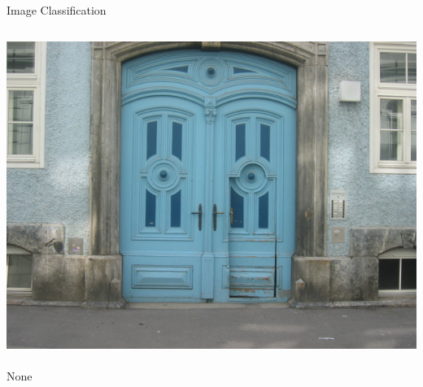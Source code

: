\documentclass{beamer}
\begin{document}
\begin{frame}{Image Classification}
\begin{columns}[T]
\begin{column}{.5\textwidth}
    \begin{center} \includegraphics[scale=0.25]{img/none1} \\~\\ {\Large None}  \end{center}
    \end{column}
  \end{columns}
  
\end{frame}
\end{document}
